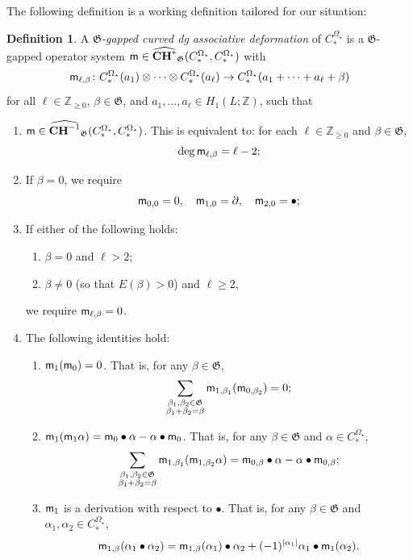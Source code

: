\documentclass[10pt]{amsart}
\numberwithin{equation}{section}
\theoremstyle{plain}
\theoremstyle{definition}
\newtheorem{definition}[theorem]{Definition}
\theoremstyle{remark}
\numberwithin{equation}{section}
\newcommand{\Z}{\mathbb{Z}}
\newcommand{\wh}[1]{\widehat{#1}}
\newcommand{\mf}[1]{\mathfrak{#1}}
\newcommand{\CC}{\textbf{\textup{CH}}}
\newcommand{\CBa}{C_*^{\Omega_\star}}
\newcommand{\mm}{\textup{\textsf{m}}}
\begin{document}
{The following definition is a working definition tailored for our situation:
\begin{definition}\label{Defn: G-gapped assdefo}
	A \emph{$\mathfrak{G}$-gapped curved dg associative deformation} of $\CBa$ is a $\mf{G}$-gapped operator system $\mm\in \wh{\CC^*}_{\mf{G}}(\CBa,\CBa)$ with \[ \mm_{\ell,\beta}\colon \CBa(a_1)\otimes \dots \otimes \CBa(a_\ell)\to \CBa(a_1+\dots + a_\ell + \beta) \] for all $\ell\in \Z_{\geq 0}$, $\beta\in \mf{G}$, and $a_1,\dots, a_\ell \in H_1(L;\Z)$, such that
	\begin{enumerate}
		\item $\mm\in \wh{\CC^{-1}}_\mf{G}(\CBa,\CBa)$. This is equivalent to: for each $\ell\in \Z_{\geq 0}$ and $\beta\in \mf{G}$, \[ \deg \mm_{\ell,\beta} = \ell - 2;\]
		\item If $\beta = 0$, we require \[\mm_{0,0}=0, \quad \mm_{1,0}=\partial, \quad \mm_{2,0} = \bullet;\]
		\item If either of the following holds:
		\begin{enumerate}
			\item $\beta=0$ and $\ell > 2$;
			\item $\beta \neq 0$ (so that $E(\beta)>0$) and $\ell \geq 2$,
		\end{enumerate}
		we require $\mm_{\ell,\beta} = 0$.
		\item The following identities hold:
		\begin{enumerate}
			\item $\mm_1(\mm_0)= 0$.
			That is, for any $\beta\in \mf{G}$, \[ \sum_{\substack{\beta_1,\beta_2\in \mf{G}\\ \beta_1+\beta_2=\beta}} \mm_{1,\beta_1}(\mm_{0,\beta_2})=0; \]
			\item $\mm_1(\mm_1 \alpha) = \mm_0 \bullet \alpha - \alpha \bullet \mm_0$. That is, for any $\beta \in \mf{G}$ and $\alpha \in \CBa$, \[ \sum_{\substack{\beta_1,\beta_2\in \mf{G}\\ \beta_1+\beta_2=\beta}} \mm_{1,\beta_1}(\mm_{1,\beta_2} \alpha) = \mm_{0,\beta} \bullet \alpha - \alpha \bullet \mm_{0,\beta};\]
			\item $\mm_1$ is a derivation with respect to $\bullet$. That is, for any $\beta \in \mf{G}$ and $\alpha_1,\alpha_2 \in \CBa$, \[ \mm_{1,\beta}(\alpha_1\bullet \alpha_2) = \mm_{1,\beta}(\alpha_1)\bullet \alpha_2 + (-1)^{|\alpha_1|} \alpha_1 \bullet \mm_1(\alpha_2). \]
		\end{enumerate}
	\end{enumerate}
\end{definition}




}
\end{document}
